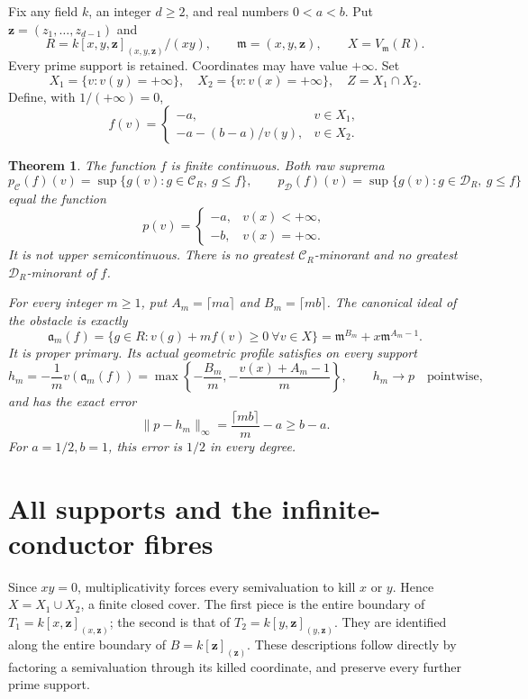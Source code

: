 \documentclass[11pt]{article}
\newtheorem{theorem}{Theorem}
\newcommand{\m}{\mathfrak m}
\newcommand{\C}{\mathcal C}
\newcommand{\D}{\mathcal D}
\begin{document}
Fix any field \(k\), an integer \(d\geq2\), and real numbers \(0<a<b\).
Put \(\mathbf z=(z_1,\ldots,z_{d-1})\) and
\[
 R=k[x,y,\mathbf z]_{(x,y,\mathbf z)}/(xy),\qquad
 \m=(x,y,\mathbf z),\qquad X=V_{\m}(R).
\]
Every prime support is retained. Coordinates may have value \(+\infty\).
Set
\[
 X_1=\{v:v(y)=+\infty\},\quad X_2=\{v:v(x)=+\infty\},
 \quad Z=X_1\cap X_2.
\]
Define, with \(1/(+\infty)=0\),
\[
 f(v)=\begin{cases}
       -a,&v\in X_1,\\
       -a-(b-a)/v(y),&v\in X_2.
       \end{cases}
\]

\begin{theorem}\label{thm:main}
The function \(f\) is finite continuous. Both raw suprema
\[
 p_{\C}(f)(v)=\sup\{g(v):g\in\C_R,\ g\leq f\},\qquad
 p_{\D}(f)(v)=\sup\{g(v):g\in\D_R,\ g\leq f\}
\]
equal the function
\[
 p(v)=\begin{cases}-a,&v(x)<+\infty,\\-b,&v(x)=+\infty.\end{cases}
\]
It is not upper semicontinuous. There is no greatest \(\C_R\)-minorant
and no greatest \(\D_R\)-minorant of \(f\).

For every integer \(m\geq1\), put \(A_m=\lceil ma\rceil\) and
\(B_m=\lceil mb\rceil\). The canonical ideal of the obstacle is exactly
\[
 \mathfrak a_m(f)=\{g\in R:v(g)+mf(v)\geq0\ \forall v\in X\}
       =\m^{B_m}+x\m^{A_m-1}.
\]
It is proper primary. Its actual geometric profile satisfies on every support
\[
 h_m=-\frac1m v(\mathfrak a_m(f))
    =\max\left\{-\frac{B_m}{m},-\frac{v(x)+A_m-1}{m}\right\},
 \qquad h_m\longrightarrow p\quad\text{pointwise},
\]
and has the exact error
\[
 \|p-h_m\|_\infty=\frac{\lceil mb\rceil}{m}-a\geq b-a.
\]
For \(a=1/2,b=1\), this error is \(1/2\) in every degree.
\end{theorem}

\section{All supports and the infinite-conductor fibres}

Since \(xy=0\), multiplicativity forces every semivaluation to kill
\(x\) or \(y\). Hence \(X=X_1\cup X_2\), a finite closed cover.
The first piece is the entire boundary of
\(T_1=k[x,\mathbf z]_{(x,\mathbf z)}\); the second is that of
\(T_2=k[y,\mathbf z]_{(y,\mathbf z)}\).
They are identified along the entire boundary of
\(B=k[\mathbf z]_{(\mathbf z)}\). These descriptions follow directly
by factoring a semivaluation through its killed coordinate, and preserve
every further prime support.
\end{document}
